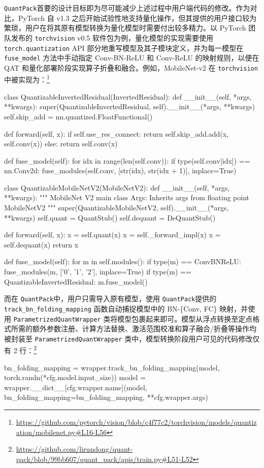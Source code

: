 \documentclass[
  fontset = source,
]{shtthesis}
\providecommand{\QP}{\texttt{QuantPack}}
\begin{document}
\QP 首要的设计目标即为尽可能减少上述过程中用户端代码的修改。作为对比，PyTorch 自 v1.3 之后开始试验性地支持量化操作，但其提供的用户接口较为繁琐，用户在将其原有模型转换为量化模型时需要付出较多精力。以 PyTorch 团队发布的 \verb|torchvision| v0.5 软件包为例，量化模型的实现需要使用 \verb|torch.quantization| API 部分地重写模型及其子模块定义，并为每一模型在 \verb|fuse_model| 方法中手动指定 Conv-BN-ReLU 和 Conv-ReLU 的映射规则，以便在 QAT 和量化部署阶段实现算子折叠和融合。例如，MobileNet-v2 在 \verb|torchvision| 中被实现为：\footnote{\url{https://github.com/pytorch/vision/blob/c4f77c2/torchvision/models/quantization/mobilenet.py\#L16-L56}}
\begin{python}
class QuantizableInvertedResidual(InvertedResidual):
    def __init__(self, *args, **kwargs):
        super(QuantizableInvertedResidual, self).__init__(*args, **kwargs)
        self.skip_add = nn.quantized.FloatFunctional()

    def forward(self, x):
        if self.use_res_connect:
            return self.skip_add.add(x, self.conv(x))
        else:
            return self.conv(x)

    def fuse_model(self):
        for idx in range(len(self.conv)):
            if type(self.conv[idx]) == nn.Conv2d:
                fuse_modules(self.conv, [str(idx), str(idx + 1)], inplace=True)


class QuantizableMobileNetV2(MobileNetV2):
    def __init__(self, *args, **kwargs):
        """
        MobileNet V2 main class
        Args:
          Inherits args from floating point MobileNetV2
        """
        super(QuantizableMobileNetV2, self).__init__(*args, **kwargs)
        self.quant = QuantStub()
        self.dequant = DeQuantStub()

    def forward(self, x):
        x = self.quant(x)
        x = self._forward_impl(x)
        x = self.dequant(x)
        return x

    def fuse_model(self):
        for m in self.modules():
            if type(m) == ConvBNReLU:
                fuse_modules(m, ['0', '1', '2'], inplace=True)
            if type(m) == QuantizableInvertedResidual:
                m.fuse_model()
\end{python}

而在 \QP 中，用户只需导入原有模型，使用 \QP 提供的 \verb|track_bn_folding_mapping| 函数自动捕捉模型中的 BN-\{Conv, FC\} 映射，并使用 \verb|ParametrizedQuantWrapper| 类将模型包裹起来即可。模型从浮点转换至定点格式所需的额外参数注册、计算方法替换、激活范围校准和算子融合/折叠等操作均被封装至 \verb|ParametrizedQuantWrapper| 类中，模型转换阶段用户可见的代码修改仅有 2 行：\footnote{\url{https://github.com/lirundong/quant-pack/blob/99bb607/quant_pack/apis/train.py\#L51-L52}}
\begin{python}
bn_folding_mapping = wrapper.track_bn_folding_mapping(model, torch.randn(*cfg.model.input_size))
model = wrapper.__dict__[cfg.wrapper.name](model, bn_folding_mapping=bn_folding_mapping, **cfg.wrapper.args)
\end{python}
\end{document}
